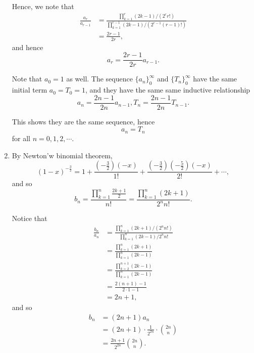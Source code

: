 \begin{enumerate}
          Hence, we note that
          \begin{align*}
              \frac{a_r}{a_{r - 1}} & = \frac{\prod_{k = 1}^{r} (2k - 1) / (2^r r!)}{\prod_{k = 1}^{r - 1} (2k - 1) / (2^{r - 1} (r - 1)!)} \\
                                    & = \frac{2r - 1}{2r},
          \end{align*}
          and hence
          \[
              a_r = \frac{2r - 1}{2r} a_{r - 1}.
          \]

          Note that \(a_0 = 1\) as well. The sequence \(\{a_n\}_{0}^{\infty}\) and \(\{T_n\}_{0}^{\infty}\) have the same initial term \(a_0 = T_0 = 1\), and they have the same same inductive relationship
          \[
              a_n = \frac{2n - 1}{2n} a_{n - 1}, T_n = \frac{2n - 1}{2n} T_{n - 1}.
          \]

          This shows they are the same sequence, hence
          \[
              a_n = T_n
          \]
          for all \(n = 0, 1, 2, \cdots\).

    \item By Newton'w binomial theorem,
          \[
              (1 - x)^{-\frac{3}{2}} = 1 + \frac{\left(- \frac{3}{2}\right) (-x)}{1!} + \frac{\left(- \frac{3}{2}\right) \left(- \frac{5}{2}\right) (-x)}{2!} + \cdots,
          \]
          and so
          \[
              b_n = \frac{\prod_{k = 1}^{n} \frac{2k + 1}{2}}{n!} = \frac{\prod_{k = 1}^{n} (2k + 1)}{2^n n!}.
          \]

          Notice that
          \begin{align*}
              \frac{b_n}{a_n} & = \frac{\prod_{k = 1}^{n} (2k + 1) / (2^n n!)}{\prod_{k = 1}^{n} (2k - 1) / 2^n n!} \\
                              & = \frac{\prod_{k = 1}^{n} (2k + 1)}{\prod_{k = 1}^{n} (2k - 1)}                     \\
                              & = \frac{\prod_{k = 2}^{n + 1} (2k - 1)}{\prod_{k = 1}^{n} (2k - 1)}                 \\
                              & = \frac{2(n + 1) - 1}{2 \cdot 1 - 1}                                                \\
                              & = 2n + 1,
          \end{align*}
          and so
          \begin{align*}
              b_n & = (2n + 1) a_n                                        \\
                  & = (2n + 1) \cdot \frac{1}{2^{2n}} \cdot \binom{2n}{n} \\
                  & = \frac{2n + 1}{2^{2n}} \binom{2n}{n}.
          \end{align*}


\end{enumerate}
